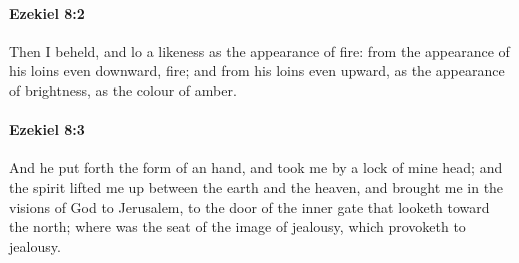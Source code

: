 		\paragraph{Ezekiel 8:2} %
			\label{EZEKIEL-8-2}

			Then I beheld, and lo a likeness as the appearance of fire: from the appearance of his loins even downward, fire; and from his loins even upward, as the appearance of brightness, as the colour of amber.


		\paragraph{Ezekiel 8:3} %
			\label{EZEKIEL-8-3}

			And he put forth the form of an hand, and took me by a lock of mine head; and the spirit lifted me up between the earth and the heaven, and brought me in the visions of God to Jerusalem, to the door of the inner gate that looketh toward the north; where was the seat of the image of jealousy, which provoketh to jealousy.

